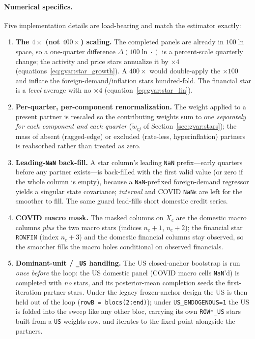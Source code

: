 \documentclass[11pt]{article}
\theoremstyle{definition}
\theoremstyle{remark}
\begin{document}
\paragraph{Numerical specifics.} Five implementation details are load-bearing and
match the estimator exactly:
\begin{enumerate}[label=(\roman*)]
  \item \textbf{The $4\times$ (not $400\times$) scaling.} The completed panels are
    already in $100\ln$ space, so a one-quarter difference $\Delta(100\ln\cdot)$
    is a percent-scale quarterly change; the activity and price stars annualize it
    by $\times 4$ (equations~\eqref{eq:gvar:star_growth}). A $400\times$ would
    double-apply the $\times100$ and inflate the foreign-demand/inflation stars
    hundred-fold. The financial star is a \emph{level} average with no $\times4$
    (equation~\eqref{eq:gvar:star_fin}).
  \item \textbf{Per-quarter, per-component renormalization.} The weight applied to
    a present partner is rescaled so the contributing weights sum to one
    \emph{separately for each component and each quarter}
    ($\tilde w_{cj}$ of Section~\ref{sec:gvar:stars}); the mass of absent
    (ragged-edge) or excluded (rate-less, hyperinflation) partners is reabsorbed
    rather than treated as zero.
  \item \textbf{Leading-\texttt{NaN} back-fill.} A star column's leading
    \texttt{NaN} prefix---early quarters before any partner exists---is back-filled
    with the first valid value (or zero if the whole column is empty), because a
    \texttt{NaN}-prefixed foreign-demand regressor yields a singular state
    covariance; \emph{internal} and COVID \texttt{NaN}s are left for the smoother
    to fill. The same guard lead-fills short domestic credit series.
  \item \textbf{COVID macro mask.} The masked columns on $X_c$ are the domestic
    macro columns \emph{plus} the two macro stars (indices $n_c{+}1$,
    $n_c{+}2$); the financial star $\texttt{ROWFIN}$ (index $n_c{+}3$) and the
    domestic financial columns stay observed, so the smoother fills the macro
    holes conditional on observed financials.
  \item \textbf{Dominant-unit / \texttt{\_US} handling.} The US closed-anchor
    bootstrap is run \emph{once before} the loop: the US domestic panel (COVID
    macro cells \texttt{NaN}'d) is completed with \emph{no} stars, and its
    posterior-mean completion seeds the first-iteration partner stars. Under the
    legacy frozen-anchor design the US is then held out of the loop
    (\texttt{rowB = blocs(2:end)}); under \texttt{US\_ENDOGENOUS=1} the US is
    folded into the sweep like any other bloc, carrying its own
    \texttt{ROW*\_US} stars built from a \texttt{US} weights row, and iterates to
    the fixed point alongside the partners.
\end{enumerate}
\end{document}
